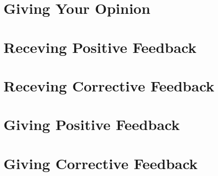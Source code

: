 \documentclass{article} %
\begin{document}
\begin{multicols}{2}

	\section{Giving Your Opinion}
    
	\section{Receving Positive Feedback}

	\section{Receving Corrective Feedback}
    
\columnbreak

	\section{Giving Positive Feedback}

	\section{Giving Corrective Feedback}

\end{multicols}
\end{document}
